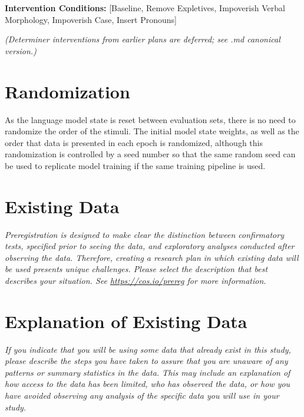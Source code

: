 \documentclass[12pt]{article}
\begin{document}
\textbf{Intervention Conditions:} [Baseline, Remove Expletives, Impoverish Verbal Morphology, Impoverish Case, Insert Pronouns]

\textit{(Determiner interventions from earlier plans are deferred; see .md canonical version.)}

\section{Randomization}

As the language model state is reset between evaluation sets, there is no need to randomize the order of the stimuli. The initial model state weights, as well as the order that data is presented in each epoch is randomized, although this randomization is controlled by a seed number so that the same random seed can be used to replicate model training if the same training pipeline is used.

\section{Existing Data}

\textit{Preregistration is designed to make clear the distinction between confirmatory tests, specified prior to seeing the data, and exploratory analyses conducted after observing the data. Therefore, creating a research plan in which existing data will be used presents unique challenges. Please select the description that best describes your situation. See \url{https://cos.io/prereg} for more information.}

\section{Explanation of Existing Data}

\textit{If you indicate that you will be using some data that already exist in this study, please describe the steps you have taken to assure that you are unaware of any patterns or summary statistics in the data. This may include an explanation of how access to the data has been limited, who has observed the data, or how you have avoided observing any analysis of the specific data you will use in your study.}
\end{document}
